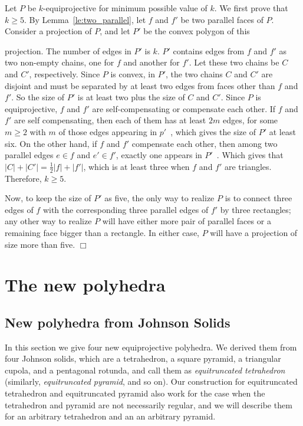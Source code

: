 \documentclass{article}
\newenvironment{proof}
{{\noindent\bf Proof}}{$\Box$}
\begin{document}
\begin{proof}
Let $P$ be $k$-equiprojective for minimum possible value of $k$.
We first prove that $k\ge 5$.
By Lemma~\ref{le:two_parallel}, let $f$ and $f'$ be two parallel faces of $P$.
Consider a projection of $P$, and let $P'$ be the convex polygon of this 

projection.
The number of edges in $P'$ is $k$.
$P'$ contains edges from $f$ and $f'$ as two non-empty chains, one for $f$ and another for $f'$.
Let these two chains be $C$ and $C'$, respectively.
Since $P$ is convex, in $P'$, the two chains $C$ and $C'$ are disjoint and 
must be separated by at least two edges from faces other than $f$ and $f'$.
So the size of $P'$ is at least two plus the size of $C$ and $C'$.
Since $P$ is equiprojective, $f$ and $f'$ are self-compensating or 
compensate each other.
If $f$ and $f'$ are self compensating, then each of them has at least $2m$ edges, for some $m \ge 2$
with $m$ of those edges appearing in $p'$~\cite{HL08}, 
which gives the size of $P'$ at least six.
On the other hand, if $f$ and $f'$ compensate each other, then among two parallel edges
$e\in f$ and $e'\in f'$, exactly one appears in $P'$~\cite{HL08}.
Which gives that $|C|+|C'|=\frac{1}{2}|f|+|f'|$,
which is at least three when $f$ and $f'$ are triangles.
Therefore, $k\ge 5$.

Now, to keep the size of $P'$ as five, the only way to realize $P$ is to connect three edges of $f$ 
with the corresponding three parallel edges of $f'$ by three rectangles;
any other way to realize $P$ will have either more pair of parallel faces or 
a remaining face bigger than a rectangle.
In either case, $P$ will have a projection of size more than five.
\end{proof}


\section{The new polyhedra}
\label{se:new}
\subsection{New polyhedra from Johnson Solids}
In this section we give four new equiprojective polyhedra.
We derived them from four Johnson solids, which are a tetrahedron, a square pyramid, a triangular cupola, and a pentagonal rotunda,
and call them as \emph{equitruncated tetrahedron} (similarly, \emph{equitruncated pyramid}, and so on).
Our construction for equitruncated tetrahedron and equitruncated pyramid also work for the case when 
the tetrahedron and pyramid are not necessarily regular, and we will describe them for
an arbitrary tetrahedron and an an arbitrary pyramid.
\end{document}
